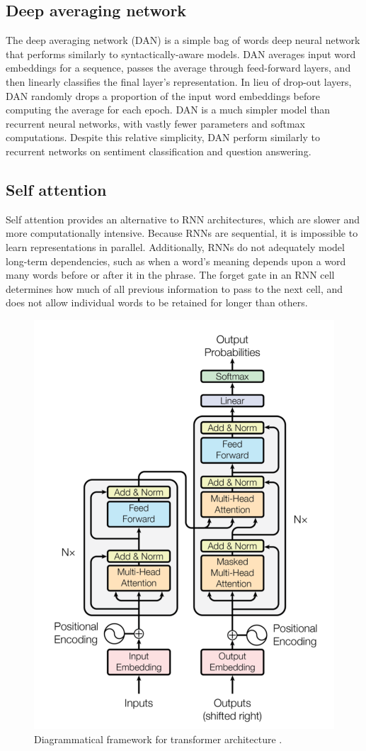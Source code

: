 \subsection{Deep averaging network}

The deep averaging network (DAN) \cite{dan} is a simple bag of words deep neural network that performs similarly to syntactically-aware models. DAN averages input word embeddings for a sequence, passes the average through feed-forward layers, and then linearly classifies the final layer's representation. In lieu of drop-out layers, DAN randomly drops a proportion of the input word embeddings before computing the average for each epoch. DAN is a much simpler model than recurrent neural networks, with vastly fewer parameters and softmax computations. Despite this relative simplicity, DAN perform similarly to recurrent networks on sentiment classification and question answering. 

\subsection{Self attention}

Self attention \cite{attention} provides an alternative to RNN architectures, which are slower and more computationally intensive. Because RNNs are sequential, it is impossible to learn representations in parallel. Additionally, RNNs do not adequately model long-term dependencies, such as when a word's meaning depends upon a word many words before or after it in the phrase. The forget gate in an RNN cell determines how much of all previous information to pass to the next cell, and does not allow individual words to be retained for longer than others. 

\begin{figure}[h!]
\centering
  \includegraphics[width=.5\linewidth]{files/attention-1.png}
  \caption{Diagrammatical framework for transformer architecture \cite{attention}.}
  \label{fig:attention-1}
\end{figure}

